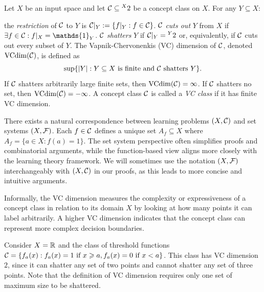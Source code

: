 \begin{definition}[VC dimension]
    Let $X$ be an input space and let $\mathcal{C}\subseteq\prescript{X}{}{2}$ be a concept class on $X$. For any $Y\subseteq X$:
    \begin{outline}
        \1 the \emph{restriction} of $\mathcal{C}$ to $Y$ is $\mathcal{C}|_Y := \{ f|_Y : f\in \mathcal{C}\}$.
        \1 $\mathcal{C}$ \emph{cuts out} $Y$ from $X$ if $\exists f\in\C : f|_X = \mathds{1}_Y$. 
        \1 $\mathcal{C}$ \emph{shatters} $Y$ if $\mathcal{C}|_Y = \prescript{Y}{}{2}$ or, equivalently, if $\mathcal{C}$ cuts out every subset of $Y$.
    \0 The Vapnik-Chervonenkis (VC) dimension of $\mathcal{C}$, denoted $\operatorname{VCdim}(\mathcal{C})$, is defined as $$\sup\{ |Y| : Y\subseteq X \text{ is finite and } \mathcal{C} \text{ shatters } Y\}.$$
    If $\mathcal{C}$ shatters arbitrarily large finite sets, then $\operatorname{VCdim}(\mathcal{C}) = \infty$. If $\mathcal{C}$ shatters no set, then $\operatorname{VCdim}(\mathcal{C}) = -\infty$. A concept class $\mathcal{C}$ is called a \emph{VC class} if it has finite VC dimension.
    \end{outline} 
\end{definition}

\begin{remark}
    \label{rem:dualitySetSystems}
    There exists a natural correspondence between learning problems $(X,\mathcal{C})$ and set systems $(X,\mathcal{F})$. Each $f\in \mathcal{C}$ defines a unique set $A_f\subseteq X$ where $A_f = \{ a\in X :f(a)=1\}$. 
    The set system perspective often simplifies proofs and combinatorial arguments, while the function-based view aligns more closely with the learning theory framework. We will sometimes use the notation $(X,\mathcal{F})$ interchangeably with $(X,\mathcal{C})$ in our proofs, as this leads to more concise and intuitive arguments.
\end{remark}

Informally, the VC dimension measures the complexity or expressiveness of a concept class in relation to its domain $X$ by looking at how many points it can label arbitrarily. A higher VC dimension indicates that the concept class can represent more complex decision boundaries.

\begin{example}[Easy]
    Consider $X=\mathbb{R}$ and the class of threshold functions $\mathcal{C} = \{f_a(x) : f_a(x)=1 \text{ if } x \geqslant a, f_a(x)=0 \text{ if } x < a\}$. This class has VC dimension $2$, since it can shatter any set of two points and cannot shatter any set of three points. Note that the definition of VC dimension requires only one set of maximum size to be shattered.
\end{example}

